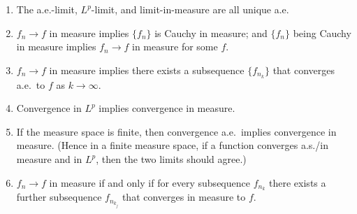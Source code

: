 \begin{thm} \label{thm:relation-modes-conv} \leavevmode
    \begin{enumerate}
        \item The a.e.-limit, $L^p$-limit, and limit-in-measure are all unique a.e.
        \item $f_n \to f$ in measure implies $\{f_n\}$ is Cauchy in measure; and $\{f_n\}$ being Cauchy in measure implies $f_n \to f$ in measure for some $f$.
        \item \label{enu:measure-subseq-ae} $f_n \to f$ in measure implies there exists a subsequence $\{f_{n_k}\}$ that converges a.e.\ to $f$ as $k \to \infty$.
        \item Convergence in $L^p$ implies convergence in measure.
        \item \label{enu:ae-implies-meas} If the measure space is finite, then convergence a.e.\ implies convergence in measure. (Hence in a finite measure space, if a function converges a.s./in measure and in $L^p$, then the two limits should agree.)
        \item $f_n \to f$ in measure if and only if for every subsequence $f_{n_k}$ there exists a further subsequence $f_{n_{k_j}}$ that converges in measure to $f$. %
    \end{enumerate}
\end{thm}
